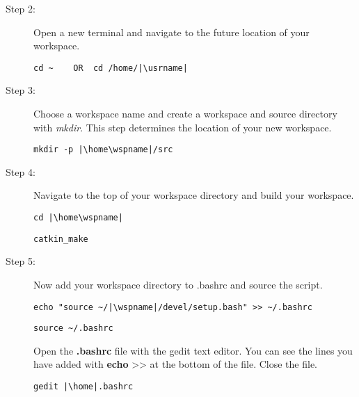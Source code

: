 \documentclass[12pt]{article}
\begin{document}
\begin{description}[labelindent=1cm]
\begin{description}
		\item[Step 2:] Open a new terminal and navigate to the future location of your workspace.
		\begin{verbatim}
cd ~	OR	cd /home/|\usrname|
		\end{verbatim}
		
		\item[Step 3:] Choose a workspace name and create a workspace and source directory with {\it mkdir}. This step determines the location of your new workspace.
		\begin{verbatim}
mkdir -p |\home\wspname|/src
		\end{verbatim}
		
		
		\item[Step 4:] Navigate to the top of your workspace directory and build your workspace.
		\begin{verbatim}
cd |\home\wspname|
		\end{verbatim}
		
		\begin{verbatim}
catkin_make
		\end{verbatim}
		
		
		\item [Step 5:]  Now add your workspace directory to .bashrc and source the script.
		\begin{verbatim} 
echo "source ~/|\wspname|/devel/setup.bash" >> ~/.bashrc
		\end{verbatim}
		
		\begin{verbatim} 
source ~/.bashrc 
		\end{verbatim}
		
		\begin{multicols}{2}
		Open the {\bf .bashrc} file with the gedit text editor. You can see the lines you have added with {\bf echo} >> at the bottom of the file. Close the file.  
		\begin{verbatim}  
gedit |\home|.bashrc
		\end{verbatim}
		\end{multicols}
		
		

\end{description}
\end{description}
\end{document}
